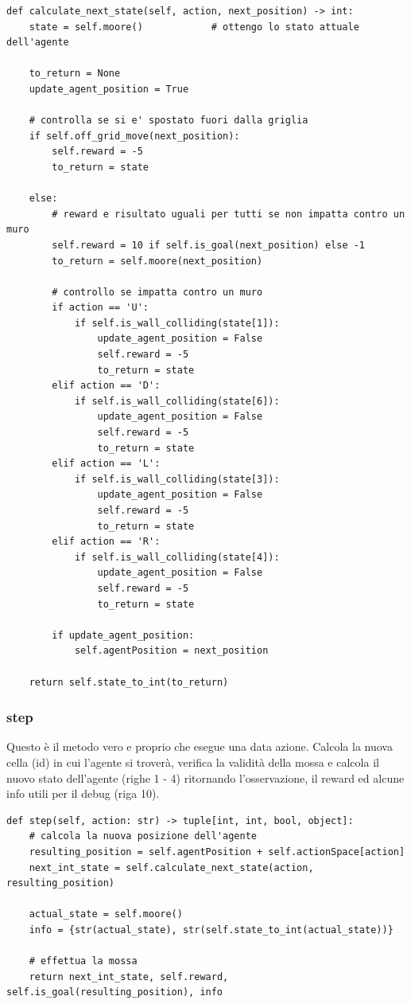 \begin{lstlisting}[style=python, caption={Codice del metodo calculate\_next\_state}]
def calculate_next_state(self, action, next_position) -> int:
	state = self.moore()            # ottengo lo stato attuale dell'agente

	to_return = None 
	update_agent_position = True 

	# controlla se si e' spostato fuori dalla griglia
	if self.off_grid_move(next_position):
		self.reward = -5
		to_return = state

	else:
		# reward e risultato uguali per tutti se non impatta contro un muro
		self.reward = 10 if self.is_goal(next_position) else -1
		to_return = self.moore(next_position)

		# controllo se impatta contro un muro
		if action == 'U':
			if self.is_wall_colliding(state[1]):
				update_agent_position = False
				self.reward = -5
				to_return = state
		elif action == 'D':
			if self.is_wall_colliding(state[6]):
				update_agent_position = False
				self.reward = -5
				to_return = state
		elif action == 'L':
			if self.is_wall_colliding(state[3]):
				update_agent_position = False
				self.reward = -5
				to_return = state
		elif action == 'R':
			if self.is_wall_colliding(state[4]):
				update_agent_position = False
				self.reward = -5
				to_return = state

		if update_agent_position:
			self.agentPosition = next_position

	return self.state_to_int(to_return)
\end{lstlisting}

\subsubsection{step}
Questo \`{e} il metodo vero e proprio che esegue una data azione. Calcola la nuova cella (id) in cui l'agente si trover\`{a}, verifica la validit\`{a} della mossa e calcola il nuovo stato dell'agente (righe 1 - 4) ritornando l'osservazione, il reward ed alcune info utili per il debug (riga 10).\\

\begin{lstlisting}[style=python, caption={Codice del metodo step}]
def step(self, action: str) -> tuple[int, int, bool, object]:
	# calcola la nuova posizione dell'agente
	resulting_position = self.agentPosition + self.actionSpace[action]
	next_int_state = self.calculate_next_state(action, resulting_position)

	actual_state = self.moore()
	info = {str(actual_state), str(self.state_to_int(actual_state))}

	# effettua la mossa
	return next_int_state, self.reward, self.is_goal(resulting_position), info

\end{lstlisting}

